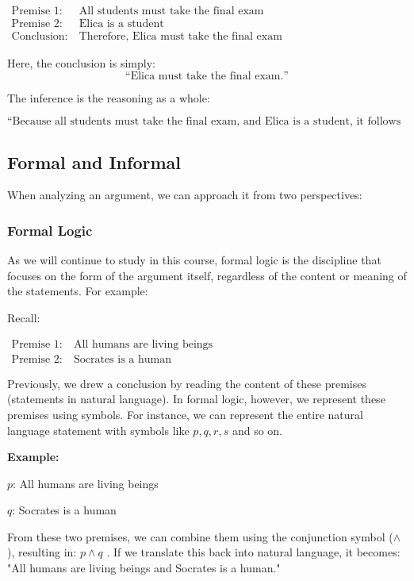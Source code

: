 \documentclass[12pt,a4paper,openany]{article}
\begin{document}
$
\begin{aligned}
\text{Premise 1:} \ & \text{All students must take the final exam} \\
\text{Premise 2:} \ & \text{Elica is a student} \\
\text{Conclusion:} \ & \text{Therefore, Elica must take the final exam}
\end{aligned}
$


Here, the conclusion is simply:  
$$\text{“Elica must take the final exam.”}$$

The inference is the reasoning as a whole:

$$\text{“Because all students must take the final exam, and Elica is a student, it follows that Elica must take the final exam.”}$$

\subsection{Formal and Informal}

When analyzing an argument, we can approach it from two perspectives:

\subsubsection{Formal Logic} 

As we will continue to study in this course, formal logic is the discipline that focuses on the form of the argument itself, regardless of the content or meaning of the statements. For example:

Recall:

$
\begin{aligned}
\text{Premise 1:} \ & \text{All humans are living beings} \\
\text{Premise 2:} \ & \text{Socrates is a human}
\end{aligned}
$

Previously, we drew a conclusion by reading the content of these premises (statements in natural language). In formal logic, however, we represent these premises using symbols. For instance, we can represent the entire natural language statement with symbols like $p, q, r, s$ and so on.

\textbf{Example:}

$p$: All humans are living beings

$q$: Socrates is a human

From these two premises, we can combine them using the conjunction symbol ($ \land $), resulting in: $p \land q$ . If we translate this back into natural language, it becomes: "All humans are living beings and Socrates is a human."
\end{document}
